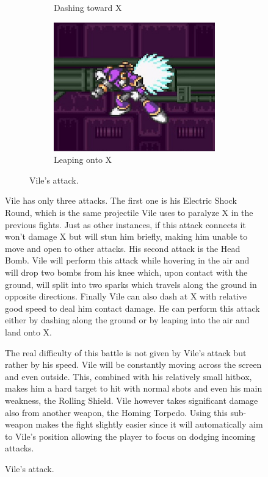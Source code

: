 \begin{figure}[htp]
\begin{figure}[htp]
\begin{subfigure}[t]{0.4\linewidth}
		\caption{Dashing toward X}
	\end{subfigure}
	\begin{subfigure}[t]{0.4\linewidth}
		\centering
		\includegraphics[width=\linewidth]{figures/X1/Sigma_stages/Vile_leap.jpg}
		\caption{Leaping onto X}
	\end{subfigure}
	\caption{Vile's attack.}
\end{figure} 


Vile has only three attacks\cite{wiki:Vile}. The first one is his Electric Shock Round, which is the same projectile Vile uses to paralyze X in the previous fights. Just as other instances, if this attack connects it won't damage X but will stun him briefly, making him unable to move and open to other attacks. His second attack is the Head Bomb. Vile will perform this attack while hovering in the air and will drop two bombs from his knee which, upon contact with the ground, will split into two sparks which travels along the ground in opposite directions. Finally Vile can also dash at X with relative good speed to deal him contact damage. He can perform this attack either by dashing along the ground or by leaping into the air and land onto X.

The real difficulty of this battle is not given by Vile's attack but rather by his speed. Vile will be constantly moving across the screen and even outside. This, combined with his relatively small hitbox, makes him a hard target to hit with normal shots and even his main weakness, the Rolling Shield. Vile however takes significant damage also from another weapon, the Homing Torpedo. Using this sub-weapon makes the fight slightly easier since it will automatically aim to Vile's position allowing the player to focus on dodging incoming attacks.


\end{figure}
